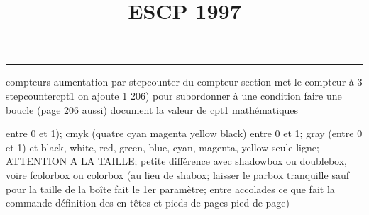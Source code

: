 \documentclass[11pt]{article}%
\title{\bf \vspace{-2cm} ESCP 1997} %
\author{} %
\date{} %
\renewcommand{\headrulewidth}{0pt}%
\renewcommand{\footrulewidth}{0.4pt}%
\begin{document}
\maketitle %
\vspace{-1.4cm}\hrule %
\thispagestyle{fancy}

\vspace*{.2cm}



compteurs%
aumentation par stepcounter du compteur section%
met le compteur à 3%
stepcounter{cpt1} on ajoute 1%
206) pour subordonner à une condition %
faire une boucle (page 206 aussi) %
document la valeur de cpt1 
mathématiques\newcommand{\ch}{\operatorname{ch}} 
\newcommand{\sh}{\operatorname{sh}}
\renewcommand{\tanh}{\operatorname{th}}
\renewcommand{\sinh}{\operatorname{sh}}
\renewcommand{\cosh}{\operatorname{ch}}
\newcommand{\argsh}{\operatorname{argsh}}
\newcommand{\argch}{\operatorname{argch}}
\newcommand{\argth}{\operatorname{argth}}
\newcommand{\ker}{\operatorname{Ker}}
\renewcommand{\im}{\operatorname{Im}}
\newcommand{\rg}{\operatorname{rg}}
\newcommand{\Id}{\operatorname{Id}}
\newcommand{\id}{\operatorname{id}}
\renewcommand{\leq}{\leq}
\renewcommand{\geq}{\geq }

entre 0 et 1); cmyk (quatre cyan magenta yellow black) entre 0 et 1;
gray (entre 0 et 1) et black, white, red, green, blue, cyan, magenta,
yellow%
seule ligne; ATTENTION A LA TAILLE; petite différence avec shadowbox ou
doublebox, voire fcolorbox ou colorbox (au lieu de shabox; laisser le
parbox tranquille sauf pour la taille de la boîte
\newcommand{\Tbox}[1]{\begin{center} \shabox{\parbox{0.6
\linewidth}{#1}} \end{center}} %
fait le 1er paramètre; entre accolades ce que fait la commande
définition des en-têtes et pieds de pages\pagestyle{fancy}
\chead{}
\rfoot[ \ \thepage]{\thepage}
\cfoot{}
\lfoot{}
\thispagestyle{fancy} %
pied de page)\renewcommand{\footrulewidth}{0.4pt}
\renewcommand{\headrulewidth}{0.4pt}
\end{document}
